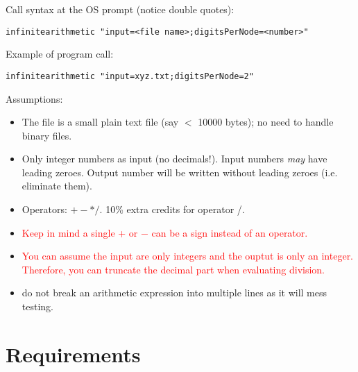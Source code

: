 Call syntax at the OS prompt (notice double quotes):
\begin{verbatim}
infinitearithmetic "input=<file name>;digitsPerNode=<number>"
\end{verbatim}

Example of program call:
\begin{verbatim}
infinitearithmetic "input=xyz.txt;digitsPerNode=2"
\end{verbatim}
Assumptions:
\begin{itemize}
\item The file is a small plain text file (say $<$ 10000 bytes); no need to handle binary files.
\item Only integer numbers as input (no decimals!). Input numbers \textit{may} have leading zeroes. Output
number will be written without leading zeroes (i.e. eliminate them).
\item Operators: $+ - * /$. 10\% extra credits for operator /.
\item \textcolor{red}{Keep in mind a single + or − can be a sign instead of an operator.}
\item \textcolor{red}{You can assume the input are only integers and the ouptut is only an integer. Therefore, you can
truncate the decimal part when evaluating division.}
\item do not break an arithmetic expression into multiple lines as it will mess testing.
\end{itemize}

\section{Requirements}

